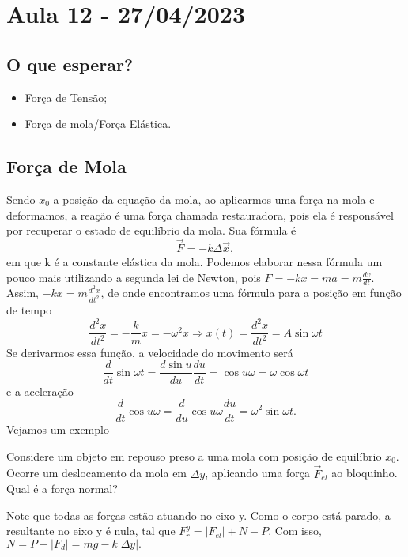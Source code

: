 \documentclass[physics_notes.tex]{subfiles}
\begin{document}
\section{Aula 12 - 27/04/2023}
\subsection{O que esperar?}
\begin{itemize}
	\item Força de Tensão;
	\item Força de mola/Força Elástica.
\end{itemize}
\subsection{Força de Mola}
Sendo $x_{0}$ a posição da equação da mola, ao aplicarmos uma força na mola e deformamos, a reação
é uma força chamada restauradora, pois ela é responsável por recuperar o estado de equilíbrio da mola. Sua fórmula é
$$
	\vec{F} = -k\Delta \vec{x},
$$
em que k é a constante elástica da mola. Podemos elaborar nessa fórmula um pouco mais utilizando a segunda lei de Newton, pois
$F = -kx = ma = m \frac{dv}{dt}.$ Assim, $-kx = m \frac{d^{2}x}{dt^{2}}$, de onde encontramos uma fórmula para a posição em função de tempo
$$
	\frac{d^{2}x}{dt^{2}} = -\frac{k}{m}x = -\omega^{2}x \Rightarrow \boxed{x(t) = \frac{d^{2}x}{dt^{2}} = A\sin{\omega t}}
$$
Se derivarmos essa função, a velocidade do movimento será
$$
	\frac{d}{dt}\sin{\omega t} = \frac{d\sin{u}}{du}\frac{du}{dt} = \cos{u}\omega = \omega \cos{\omega t}
$$
e a aceleração
$$
	\frac{d}{dt}\cos{u} \omega = \frac{d}{du}\cos{u}\omega \frac{du}{dt} = \omega^{2}\sin{\omega t}.
$$
Vejamos um exemplo
\begin{example}
	Considere um objeto em repouso preso a uma mola com posição de equilíbrio $x_{0}$. Ocorre um
	deslocamento da mola em $\Delta y$, aplicando uma força $\vec{F}_{el}$ ao bloquinho. Qual é a força normal?

	Note que todas as forças estão atuando no eixo y. Como o corpo está parado, a resultante no eixo y é nula, tal que
	$F_{r}^{y} = |F_{el}| + N - P$. Com isso, $N = P - |F_{d}| = mg - k|\Delta y|.$
\end{example}
\end{document}
